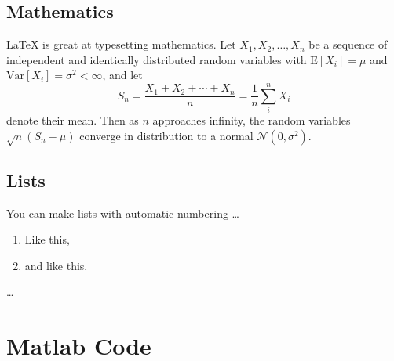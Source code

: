 \documentclass[a4paper,man,natbib]{apa6}
\begin{document}
\subsection{Mathematics}

\LaTeX{} is great at typesetting mathematics. Let $X_1, X_2, \ldots, X_n$ be a sequence of independent and identically distributed random variables with $\text{E}[X_i] = \mu$ and $\text{Var}[X_i] = \sigma^2 < \infty$, and let
$$S_n = \frac{X_1 + X_2 + \cdots + X_n}{n}
      = \frac{1}{n}\sum_{i}^{n} X_i$$
denote their mean. Then as $n$ approaches infinity, the random variables $\sqrt{n}(S_n - \mu)$ converge in distribution to a normal $\mathcal{N}(0, \sigma^2)$.

\subsection{Lists}

You can make lists with automatic numbering \dots

\begin{enumerate}
\item Like this,
\item and like this.
\end{enumerate}
\dots



\clearpage  %
\section*{Matlab Code}

\end{document}
